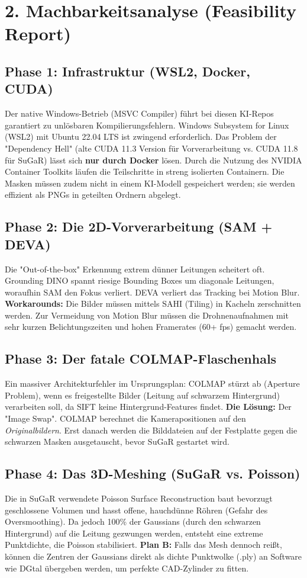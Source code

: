 \documentclass[11pt, a4paper]{article}
\begin{document}
\section{2. Machbarkeitsanalyse (Feasibility Report)}

\subsection{Phase 1: Infrastruktur (WSL2, Docker, CUDA)}
Der native Windows-Betrieb (MSVC Compiler) f\"uhrt bei diesen KI-Repos garantiert zu unl\"osbaren Kompilierungsfehlern. Windows Subsystem for Linux (WSL2) mit Ubuntu 22.04 LTS ist zwingend erforderlich. 
Das Problem der "Dependency Hell" (alte CUDA 11.3 Version f\"ur Vorverarbeitung vs. CUDA 11.8 f\"ur SuGaR) l\"asst sich \textbf{nur durch Docker} l\"osen. Durch die Nutzung des NVIDIA Container Toolkits l\"aufen die Teilschritte in streng isolierten Containern. Die Masken m\"ussen zudem nicht in einem KI-Modell gespeichert werden; sie werden effizient als PNGs in geteilten Ordnern abgelegt.

\subsection{Phase 2: Die 2D-Vorverarbeitung (SAM + DEVA)}
Die "Out-of-the-box" Erkennung extrem d\"unner Leitungen scheitert oft. Grounding DINO spannt riesige Bounding Boxes um diagonale Leitungen, woraufhin SAM den Fokus verliert. DEVA verliert das Tracking bei Motion Blur. 
\textbf{Workarounds:} Die Bilder m\"ussen mittels SAHI (Tiling) in Kacheln zerschnitten werden. Zur Vermeidung von Motion Blur m\"ussen die Drohnenaufnahmen mit sehr kurzen Belichtungszeiten und hohen Framerates (60+ fps) gemacht werden.

\subsection{Phase 3: Der fatale COLMAP-Flaschenhals}
Ein massiver Architekturfehler im Ursprungsplan: COLMAP st\"urzt ab (Aperture Problem), wenn es freigestellte Bilder (Leitung auf schwarzem Hintergrund) verarbeiten soll, da SIFT keine Hintergrund-Features findet.
\textbf{Die L\"osung:} Der "Image Swap". COLMAP berechnet die Kamerapositionen auf den \textit{Originalbildern}. Erst danach werden die Bilddateien auf der Festplatte gegen die schwarzen Masken ausgetauscht, bevor SuGaR gestartet wird.

\subsection{Phase 4: Das 3D-Meshing (SuGaR vs. Poisson)}
Die in SuGaR verwendete Poisson Surface Reconstruction baut bevorzugt geschlossene Volumen und hasst offene, hauchd\"unne R\"ohren (Gefahr des Oversmoothing). Da jedoch 100\% der Gaussians (durch den schwarzen Hintergrund) auf die Leitung gezwungen werden, entsteht eine extreme Punktdichte, die Poisson stabilisiert. 
\textbf{Plan B:} Falls das Mesh dennoch rei\ss t, k\"onnen die Zentren der Gaussians direkt als dichte Punktwolke (.ply) an Software wie DGtal \"ubergeben werden, um perfekte CAD-Zylinder zu fitten.
\end{document}
